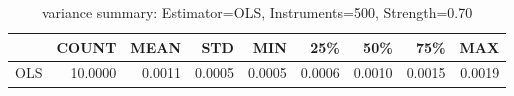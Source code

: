 \begin{table}[ht]
\centering
\caption{variance summary: Estimator=OLS, Instruments=500, Strength=0.70}
\begin{tabular}{lrrrrrrrr}
\toprule
 & COUNT & MEAN & STD & MIN & 25\% & 50\% & 75\% & MAX \\
\midrule
OLS & 10.0000 & 0.0011 & 0.0005 & 0.0005 & 0.0006 & 0.0010 & 0.0015 & 0.0019 \\
\bottomrule
\end{tabular}
\end{table}
